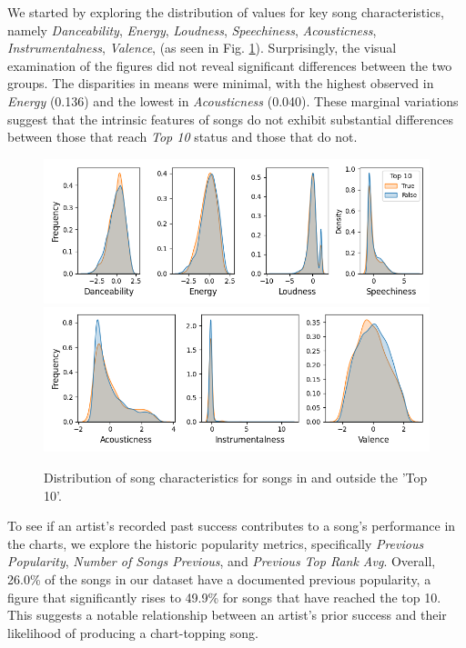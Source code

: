 \documentclass{article}
\begin{document}
We started by exploring the distribution of values for key song characteristics, namely \textit{Danceability}, \textit{Energy}, \textit{Loudness}, \textit{Speechiness}, \textit{Acousticness}, \textit{Instrumentalness}, \textit{Valence}, (as seen in Fig. \ref{fig:dist}). Surprisingly, the visual examination of the figures did not reveal significant differences between the two groups. The disparities in means were minimal, with the highest observed in \textit{Energy} (0.136) and the lowest in \textit{Acousticness} (0.040). These marginal variations suggest that the intrinsic features of songs do not exhibit substantial differences between those that reach \textit{Top 10} status and those that do not.




\begin{figure}[h]
  \centering
  \includegraphics[width=0.8\linewidth]{distplot_chars.png}
  \includegraphics[width=0.8\linewidth]{distplot_chars_rest.png}
  \caption{Distribution of song characteristics for songs in and outside the 'Top 10'.}
  \label{fig:dist}
\end{figure}


To see if an artist's recorded past success contributes to a song’s performance in the charts, we explore the historic popularity metrics, specifically \textit{Previous Popularity}, \textit{Number of Songs Previous}, and \textit{Previous Top Rank Avg}. Overall, 26.0\% of the songs in our dataset have a documented previous popularity, a figure that significantly rises to 49.9\% for songs that have reached the top 10. This suggests a notable relationship between an artist's prior success and their likelihood of producing a chart-topping song.
\end{document}
